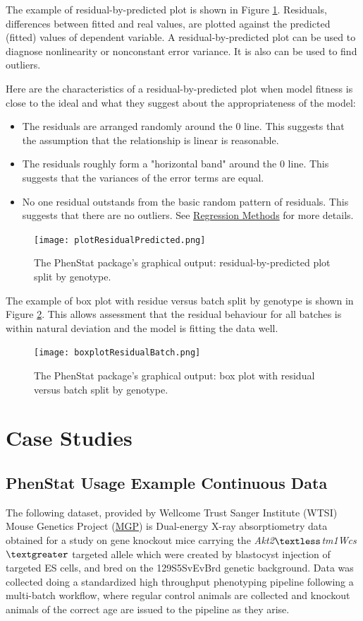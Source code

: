 \documentclass[12pt,a4paper]{article}
\begin{document}
The example of residual-by-predicted plot is shown in Figure \ref{fig:13}. Residuals, differences between fitted and real values, are plotted against the predicted (fitted) values of dependent variable.  
A residual-by-predicted plot can be used to diagnose nonlinearity or nonconstant error variance. It is also can be used to find outliers. 

Here are the characteristics of a residual-by-predicted plot when model fitness is close to the ideal and what they suggest about the appropriateness of the model:
\begin{itemize}
\item The residuals are arranged randomly around the 0 line. This suggests that the assumption that the relationship is linear is reasonable.
\item The residuals roughly form a "horizontal band" around the 0 line. This suggests that the variances of the error terms are equal.
\item No one residual outstands from the basic random pattern of residuals. This suggests that there are no outliers. See \href{https://onlinecourses.science.psu.edu/stat501/node/36}{Regression Methods} for more details.
\end{itemize}
\begin{figure}[!htpb]%
\centerline{\texttt{[image: plotResidualPredicted.png]}}
\caption{The PhenStat package's graphical output: residual-by-predicted plot split by genotype.}\label{fig:13}
\end{figure}

The example of box plot with residue versus batch split by genotype is shown in Figure \ref{fig:14}. This allows assessment that the residual behaviour for all batches is within natural deviation and the model is fitting the data well.
\begin{figure}[!htpb]%
\centerline{\texttt{[image: boxplotResidualBatch.png]}}
\caption{The PhenStat package's graphical output: box plot with residual versus batch split by genotype.}\label{fig:14}
\end{figure}
   
\section{Case Studies}
\subsection{PhenStat Usage Example Continuous Data}
The following dataset, provided by Wellcome Trust Sanger Institute (WTSI) Mouse Genetics Project (\href{http://www.sanger.ac.uk/resources/mouse/}{MGP}) 
is Dual-energy X-ray absorptiometry data obtained for a study on gene knockout mice carrying the \textit{Akt2$\textless$tm1Wcs$\textgreater$} targeted allele which were created by blastocyst 
injection of targeted ES cells, and bred on the 129S5\/SvEvBrd genetic background.  
Data was collected doing a standardized high throughput phenotyping pipeline following a multi-batch workflow, where regular control animals are collected and knockout animals of the correct age are issued to the pipeline as they arise.  
\end{document}

